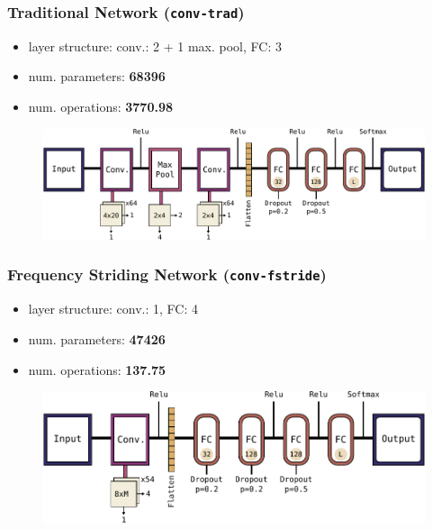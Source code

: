 \begin{frame}
  \frametitle{Traditional Network (\texttt{conv-trad})}
  \begin{itemize}
    \item layer structure: conv.: 2 + 1 max. pool, FC: 3
    \item num. parameters: \textbf{\num{68396}}
    \item num. operations: \textbf{\SI{3770.98}{\kilo\ops}}
  \end{itemize}
  \begin{figure} \includegraphics[height=0.35\textheight]{../4_nn/figs/nn_arch_cnn_trad.pdf} \end{figure}
\end{frame}

\begin{frame}
  \frametitle{Frequency Striding Network (\texttt{conv-fstride})}
  \begin{itemize}
    \item layer structure: conv.: 1, FC: 4
    \item num. parameters: \textbf{\num{47426}} 
    \item num. operations: \textbf{\SI{137.75}{\kilo\ops}}
  \end{itemize}
  \begin{figure} \includegraphics[height=0.35\textheight]{../4_nn/figs/nn_arch_cnn_fstride.pdf} \end{figure}
\end{frame}


